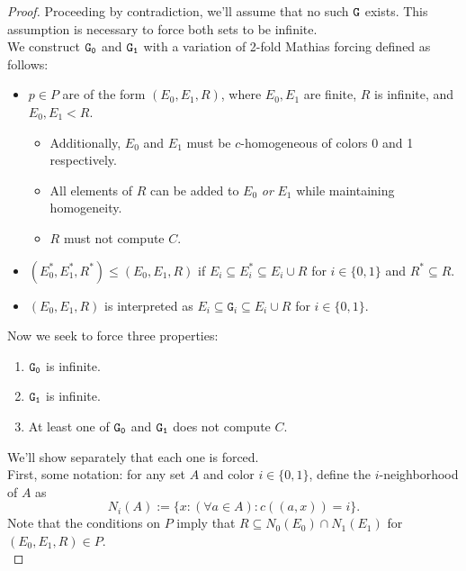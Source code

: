 \documentclass{amsart}
\begin{document}
\begin{proof}
		Proceeding by contradiction, we'll assume that no such $\tt{G}$ exists. This assumption is necessary to force both sets to be infinite.\\
		
		We construct $\tt{G_0}$ and $\tt{G_1}$ with a variation of 2-fold Mathias forcing defined as follows:
		\begin{itemize}
			\item $p\in P$ are of the form $(E_0,E_1,R)$, where $E_0,E_1$ are finite, $R$ is infinite, and $E_0,E_1<R$.
			\begin{itemize}
				\item Additionally, $E_0$ and $E_1$ must be $c$-homogeneous of colors 0 and 1 respectively.
				\item All elements of $R$ can be added to $E_0$ \textit{or} $E_1$ while maintaining homogeneity.
				\item $R$ must not compute $C$.
			\end{itemize}
			\item $(E_0^*,E_1^*,R^*)\leq (E_0,E_1,R)$ if $E_i\subseteq E_i^*\subseteq E_i\cup R$ for $i\in\{0,1\}$ and $R^*\subseteq R$.
			\item $(E_0,E_1,R)$ is interpreted as $E_i\subseteq \mathtt{G}_i \subseteq E_i \cup R$ for $i\in \{0,1\}$.
		\end{itemize}
		Now we seek to force three properties:
		\begin{enumerate}
			\item $\tt{G_0}$ is infinite.
			\item $\tt{G_1}$ is infinite.
			\item At least one of $\tt{G_0}$ and $\tt{G_1}$ does not compute $C$.
		\end{enumerate}
		We'll show separately that each one is forced.\\
		
		First, some notation: for any set $A$ and color $i\in \{0,1\}$, define the $i$-neighborhood of $A$ as
		$$N_i(A):= \{x : (\forall a\in A): c((a,x)) = i\}.$$
		Note that the conditions on $P$ imply that $R\subseteq N_0(E_0)\cap N_1(E_1)$ for $(E_0,E_1,R)\in P$.\\
		

\end{proof}
\end{document}
